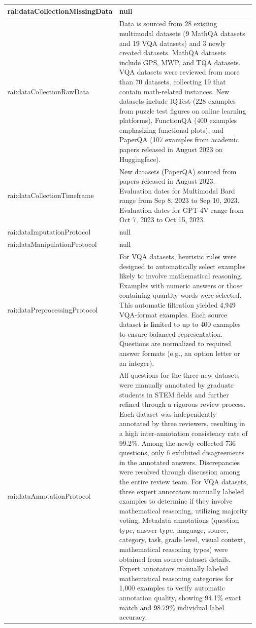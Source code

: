 \documentclass[10pt,a4paper]{article}
\begin{document}
\begin{longtable}{|p{4cm}|p{12cm}|}
\hline
rai:dataCollectionMissingData & null \\
\hline
rai:dataCollectionRawData & Data is sourced from 28 existing multimodal datasets (9 MathQA datasets and 19 VQA datasets) and 3 newly created datasets. MathQA datasets include GPS, MWP, and TQA datasets. VQA datasets were reviewed from more than 70 datasets, collecting 19 that contain math-related instances. New datasets include IQTest (228 examples from puzzle test figures on online learning platforms), FunctionQA (400 examples emphasizing functional plots), and PaperQA (107 examples from academic papers released in August 2023 on Huggingface). \\
\hline
rai:dataCollectionTimeframe & New datasets (PaperQA) sourced from papers released in August 2023. Evaluation dates for Multimodal Bard range from Sep 8, 2023 to Sep 10, 2023. Evaluation dates for GPT-4V range from Oct 7, 2023 to Oct 15, 2023. \\
\hline
rai:dataImputationProtocol & null \\
\hline
rai:dataManipulationProtocol & null \\
\hline
rai:dataPreprocessingProtocol & For VQA datasets, heuristic rules were designed to automatically select examples likely to involve mathematical reasoning. Examples with numeric answers or those containing quantity words were selected. This automatic filtration yielded 4,949 VQA-format examples. Each source dataset is limited to up to 400 examples to ensure balanced representation. Questions are normalized to required answer formats (e.g., an option letter or an integer). \\
\hline
rai:dataAnnotationProtocol & All questions for the three new datasets were manually annotated by graduate students in STEM fields and further refined through a rigorous review process. Each dataset was independently annotated by three reviewers, resulting in a high inter-annotation consistency rate of 99.2\%. Among the newly collected 736 questions, only 6 exhibited disagreements in the annotated answers. Discrepancies were resolved through discussion among the entire review team. For VQA datasets, three expert annotators manually labeled examples to determine if they involve mathematical reasoning, utilizing majority voting. Metadata annotations (question type, answer type, language, source, category, task, grade level, visual context, mathematical reasoning types) were obtained from source dataset details. Expert annotators manually labeled mathematical reasoning categories for 1,000 examples to verify automatic annotation quality, showing 94.1\% exact match and 98.79\% individual label accuracy. \\

\end{longtable}
\end{document}
